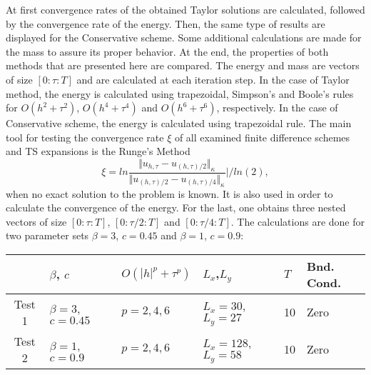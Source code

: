 \documentclass{article}
\begin{document}
At first convergence rates of the obtained Taylor solutions are calculated, followed by the convergence rate of the energy. Then, the same type of results are displayed for the Conservative scheme. Some additional calculations are made for the mass to assure its proper behavior. At the end, the properties of both methods that are presented here are compared. The energy and mass are vectors of size $[0:\tau:T]$ and are calculated at each iteration step. In the case of Taylor method, the energy is calculated using trapezoidal, Simpson's and Boole's rules for $O(h^{2} + \tau^2 )$, $O(h^{4} + \tau^4 )$ and $O(h^{6} + \tau^6 )$, respectively. In the case of Conservative scheme, the energy is calculated using trapezoidal rule. The main tool for testing the convergence rate $\xi$ of all examined finite difference schemes and TS expansions is the Runge's Method
\begin{equation}\label{Runge}
\xi = ln  \frac{\Vert u_{h,\tau} - u_{(h,\tau)/2} \Vert_\kappa } {\Vert  u_{(h,\tau)/2} - u_{(h,\tau)/4} \Vert_\kappa  } | / ln(2),
\end{equation}
when no exact solution to the problem is known. It is also used in order to calculate the convergence of the energy. For the last, one obtains three nested vectors of size $[0:\tau:T]$, $[0:\tau/2:T]$ and $[0:\tau/4:T]$. The calculations are done for two parameter sets $\beta = 3$, $c=0.45$ and $\beta = 1$, $c=0.9$:

\begin{table}[ht]
\centering
\small
		\begin{tabular}{||c|l|l|l|l|l||}
			\hline
			\hline
                                            &    $\beta$, $c$                              & $O(|h|^p + \tau^p)$                                 & $L_x$,$L_y$                                & $T$      &  Bnd. Cond.   \\

   			\hline 
					\hline 
           Test 1                        &      $\beta = 3$, $c=0.45$           &      $p=2, 4, 6$                              & $L_x = 30$,$L_y=27$                &                10    &    Zero  \\
	   \hline
			\hline 
           Test 2                        &      $\beta = 1$, $c=0.9$             &      $p=2, 4, 6$                              & $L_x = 128$,$L_y=58$                &               10    &   Zero  \\
	   \hline
			\hline 
		\end{tabular}

\end{table}
\end{document}
